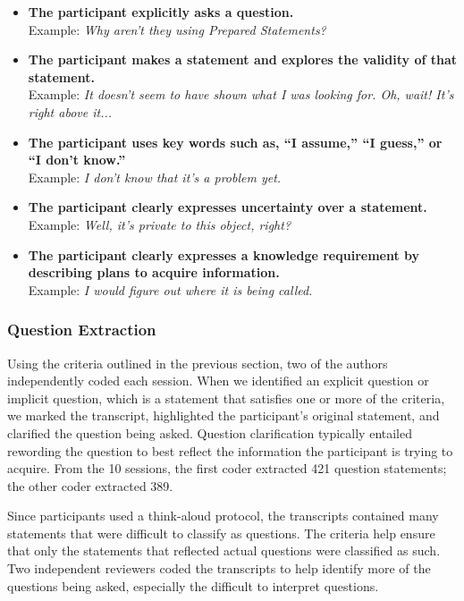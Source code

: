 \documentclass[conference]{IEEEtran}
\begin{document}
\begin{itemize}
\item \textbf{The participant explicitly asks a question.}
\\ Example: \textit{Why aren't they using Prepared Statements?}
\item \textbf{The participant makes a statement and explores the validity of that statement.}
\\ Example: \textit{It doesn't seem to have shown what I was looking for. Oh, wait! It's right above it...}
\item \textbf{The participant uses key words such as, ``I assume,'' ``I guess,'' or ``I don't know.''}
\\ Example: \textit{I don't know that it's a problem yet.}
\item \textbf{The participant clearly expresses uncertainty over a statement.}
\\ Example: \textit{Well, it's private to this object, right?}
\item \textbf{The participant clearly expresses a knowledge requirement by describing plans to acquire information.}
\\ Example: \textit{I would figure out where it is being called.}

\end{itemize}

\subsubsection{Question Extraction}
Using the criteria outlined in the previous section, two of the authors independently coded each session. 
When we identified an explicit question or implicit question, which is a statement that satisfies one or more of the criteria, we marked the transcript, highlighted the participant's original statement, and clarified the question being asked.
Question clarification typically entailed rewording the question to best reflect the information the participant is trying to acquire.
From the 10 sessions, the first coder extracted 421 question statements; the other coder extracted 389. 

Since participants used a think-aloud protocol, the transcripts contained many statements that were difficult to classify as questions. 
The criteria help ensure that only the statements that reflected actual questions were classified as such. 
Two independent reviewers coded the transcripts to help identify more of the questions being asked, especially the difficult to interpret questions.
\end{document}
